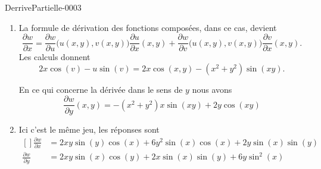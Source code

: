 
\begin{corrige}{DerrivePartielle-0003}

	\begin{enumerate}

		\item
			La formule de dérivation des fonctions composées, dans ce cas, devient
			\begin{equation}
				\frac{ \partial w }{ \partial x }=\frac{ \partial w }{ \partial u }\big( u(x,y),v(x,y) \big)\frac{ \partial u }{ \partial x }(x,y)+\frac{ \partial w }{ \partial v }\big( u(x,y),v(x,y) \big)\frac{ \partial v }{ \partial x }(x,y).
			\end{equation}
			Les calculs donnent
			\begin{equation}
				2x\cos(v)-u\sin(v)=2x\cos(x,y)-(x^2+y^2)\sin(xy).
			\end{equation}

			En ce qui concerne la dérivée dans le sens de $y$ nous avons
			\begin{equation}
				\frac{ \partial w }{ \partial y }(x,y)=-(x^2 + y^2)x\sin(xy) + 2y\cos(xy)
			\end{equation}
		\item
			Ici c'est le même jeu, les réponses sont
			\begin{equation}
				\begin{aligned}[]
					\frac{ \partial w }{ \partial x }&=2xy\sin(y)\cos(x) + 6y^2\sin(x)\cos(x) + 2y\sin(x)\sin(y)\\
					\frac{ \partial w }{ \partial y }&=2xy\sin(x)\cos(y) + 2x\sin(x)\sin(y) + 6y\sin^2(x)
				\end{aligned}
			\end{equation}

	\end{enumerate}

\end{corrige}
